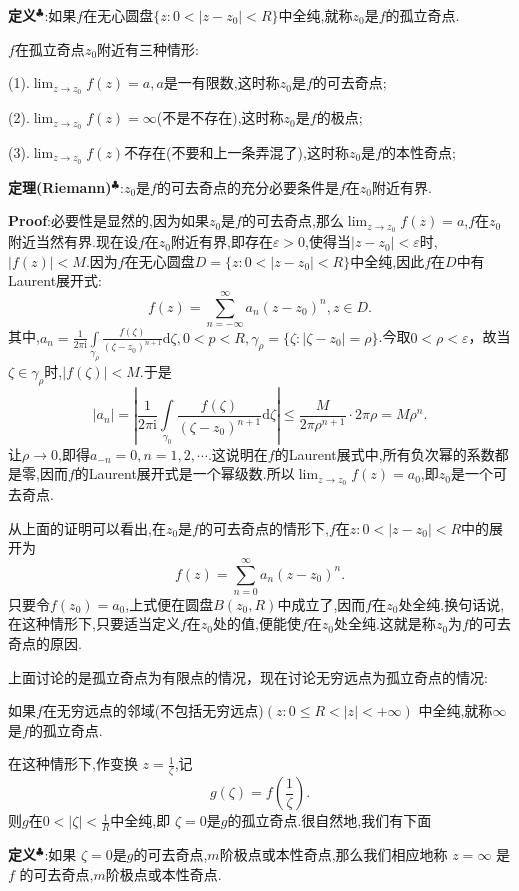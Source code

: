 \textbf{定义}$^\clubsuit$:如果$f$在无心圆盘$\{z:0<|z-z_0|<R\}$中全纯,就称$z_0$是$f$的孤立奇点.\par
$f$在孤立奇点$z_0$附近有三种情形:\par
(1).$\lim_{z\to z_0}f(z)=a,a$是一有限数,这时称$z_0$是$f$的可去奇点;\par
(2).$\lim_{z\to z_0}f(z)=\infty$(不是不存在),这时称$z_0$是$f$的极点;\par
(3).$\lim_{z\to z_0}f(z)$不存在(不要和上一条弄混了),这时称$z_0$是$f$的本性奇点;\par
\textbf{定理(Riemann)}$^\clubsuit$:$z_0$是$f$的可去奇点的充分必要条件是$f$在$z_0$附近有界.\par
\textbf{Proof}:必要性是显然的,因为如果$z_0$是$f$的可去奇点,那么$\lim_{z \to z_0} f(z) = a$,$f$在$z_0$附近当然有界.现在设$f$在$z_0$附近有界,即存在$\varepsilon>0$,使得当$|z - z_0| < \varepsilon$时,$|f(z)| < M$.因为$f$在无心圆盘$D = \{z : 0 < |z - z_0| < R\}$中全纯,因此$f$在$D$中有Laurent展开式:
$$
f(z)=\sum_{n=-\infty}^{\infty}a_n(z-z_0)^n,z\in D.
$$
其中,$a_n=\frac{1}{2\pi \mathrm{i}}\int\limits_{\gamma_\rho}\frac{f(\zeta)}{(\zeta-z_0)^{n+1}}\mathrm{d}\zeta,0<p<R,\gamma_\rho=\{\zeta:\vert\zeta-z_0\vert=\rho\}$.今取$0<\rho<\varepsilon$，故当$\zeta\in\gamma_\rho$时,$|f(\zeta)|<M$.于是
$$
|a_n|=\left|\frac{1}{2\pi \mathrm{i}}\int\limits_{\gamma_0}\frac{f(\zeta)}{(\zeta-z_0)^{n+1}}\mathrm{d}\zeta\right|\leqslant\frac{M}{2\pi\rho^{n+1}}\cdot2\pi\rho=M\rho ^n.
$$
让$\rho→0$,即得$a_{-n}=0,n=1,2,\cdots$.这说明在$f$的Laurent展式中,所有负次幂的系数都是零,因而$f$的Laurent展开式是一个幂级数.所以$\lim_{z \to z_0} f(z) = a_0$,即$z_0$是一个可去奇点.\par
从上面的证明可以看出,在$z_0$是$f$的可去奇点的情形下,$f$在${z:0<|z-z_0|<R}$中的展开为
$$
f(z)=\sum_{n=0}^{\infty}a_n(z-z_0)^n.
$$
\qquad 只要令$f(z_0)=a_0$,上式便在圆盘$B(z_0,R)$中成立了,因而$f$在$z_0$处全纯.换句话说,在这种情形下,只要适当定义$f$在$z_0$处的值,便能使$f$在$z_0$处全纯.这就是称$z_0$为$f$的可去奇点的原因.\par
上面讨论的是孤立奇点为有限点的情况，现在讨论无穷远点为孤立奇点的情况:\par
如果$f$在无穷远点的邻域(不包括无穷远点)$(z : 0 \leqslant R < |z| < +\infty)$ 中全纯,就称$\infty$是$f$的孤立奇点.\par
在这种情形下,作变换 $z = \frac{1}{\zeta}$,记  
$$
g(\zeta) = f\left( \frac{1}{\zeta} \right).
$$
则$g$在$0< |\zeta| < \frac{1}{R}$中全纯,即 $\zeta = 0$是$g$的孤立奇点.很自然地,我们有下面\par
\textbf{定义}$^\clubsuit$:如果 $\zeta = 0$是$g$的可去奇点,$m$阶极点或本性奇点,那么我们相应地称 $z = \infty$ 是 $f$ 的可去奇点,$m$阶极点或本性奇点.
